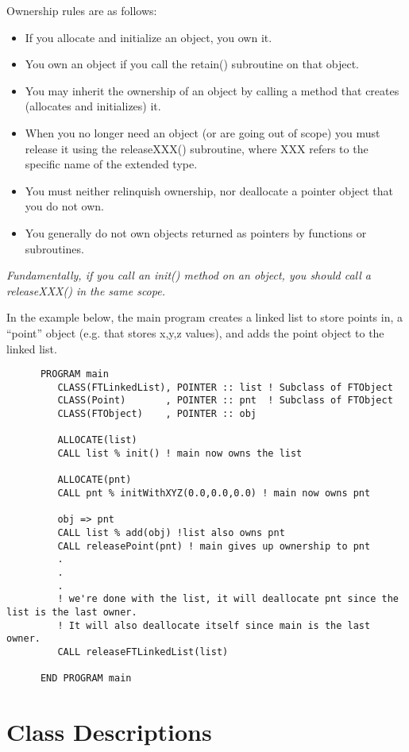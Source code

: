 \documentclass[9pt]{article}
\begin{document}
 Ownership rules are as follows:
 \begin{itemize}
\item If you allocate and initialize an object, you own it.
\item You own an object if you call the retain() subroutine on that object.
\item You may inherit the ownership of an object by calling a method that creates (allocates and initializes) it.
\item When you no longer need an object (or are going out of scope) you must release it using the releaseXXX() subroutine, where XXX refers to the specific name of the extended type.
\item You must neither relinquish ownership, nor deallocate a pointer object that you do not own.
\item You generally do not own objects returned as pointers by functions or subroutines.
  \end{itemize}
  
\emph{Fundamentally, if you call an init() method on an object, you should call a releaseXXX()  in the same scope.}
  
 In the example below, the main program creates a linked list to store points in, a ``point'' object (e.g. that stores x,y,z values), and adds
 the point object to the linked list. 

{\color{blue}\begin{verbatim}
      PROGRAM main
         CLASS(FTLinkedList), POINTER :: list ! Subclass of FTObject
         CLASS(Point)       , POINTER :: pnt  ! Subclass of FTObject
         CLASS(FTObject)    , POINTER :: obj
         
         ALLOCATE(list)
         CALL list % init() ! main now owns the list
         
         ALLOCATE(pnt)
         CALL pnt % initWithXYZ(0.0,0.0,0.0) ! main now owns pnt
         
         obj => pnt
         CALL list % add(obj) !list also owns pnt
         CALL releasePoint(pnt) ! main gives up ownership to pnt
         .
         .
         .
         ! we're done with the list, it will deallocate pnt since the list is the last owner.
         ! It will also deallocate itself since main is the last owner.
         CALL releaseFTLinkedList(list) 

      END PROGRAM main
\end{verbatim}}

\section{Class Descriptions}
\end{document}
